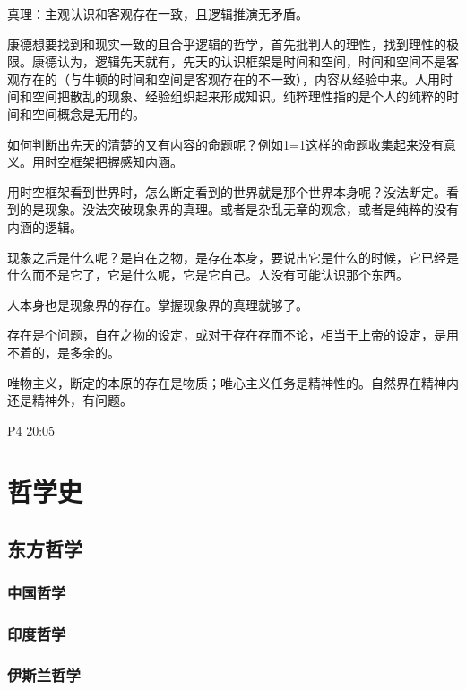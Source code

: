 \documentclass[UTF8]{../RepresentationUniverse}
\begin{document}
真理：主观认识和客观存在一致，且逻辑推演无矛盾。

康德想要找到和现实一致的且合乎逻辑的哲学，首先批判人的理性，找到理性的极限。康德认为，逻辑先天就有，先天的认识框架是时间和空间，时间和空间不是客观存在的（与牛顿的时间和空间是客观存在的不一致），内容从经验中来。人用时间和空间把散乱的现象、经验组织起来形成知识。纯粹理性指的是个人的纯粹的时间和空间概念是无用的。

如何判断出先天的清楚的又有内容的命题呢？例如1=1这样的命题收集起来没有意义。用时空框架把握感知内涵。

用时空框架看到世界时，怎么断定看到的世界就是那个世界本身呢？没法断定。看到的是现象。没法突破现象界的真理。或者是杂乱无章的观念，或者是纯粹的没有内涵的逻辑。

现象之后是什么呢？是自在之物，是存在本身，要说出它是什么的时候，它已经是什么而不是它了，它是什么呢，它是它自己。人没有可能认识那个东西。

人本身也是现象界的存在。掌握现象界的真理就够了。

存在是个问题，自在之物的设定，或对于存在存而不论，相当于上帝的设定，是用不着的，是多余的。


唯物主义，断定的本原的存在是物质；唯心主义任务是精神性的。自然界在精神内还是精神外，有问题。

P4 20:05















\chapter{哲学史}

    \section{东方哲学}
        \subsection{中国哲学}
        \subsection{印度哲学}
        \subsection{伊斯兰哲学}
\end{document}
